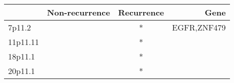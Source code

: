 \begin{tabular}{lccr}
\toprule
{} & Non-recurrence & Recurrence &         Gene \\
\midrule
7p11.2   &                &          * &  EGFR,ZNF479 \\
11p11.11 &                &          * &              \\
18p11.1  &                &          * &              \\
20p11.1  &                &          * &              \\
\bottomrule
\end{tabular}
